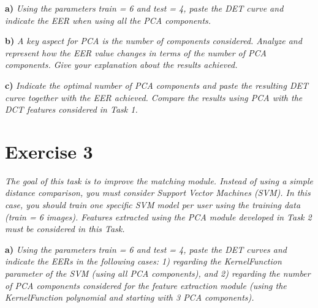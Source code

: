 \documentclass[11pt]{article}
\begin{document}

\textbf{a)} \emph{Using the parameters train = 6 and test = 4, paste the DET curve and indicate the EER when using all the PCA components.}

\textbf{b)} \emph{A key aspect for PCA is the number of components considered. Analyze and represent how the EER value changes in terms of the number of PCA components. Give your explanation about the results achieved.}

\textbf{c)} \textit{Indicate the optimal number of PCA components and paste the resulting DET curve together with the EER achieved. Compare the results using PCA with the DCT features considered in Task 1.}

\section*{Exercise 3}

\textit{The goal of this task is to improve the matching module. Instead of using a simple distance comparison, you must consider Support Vector Machines (SVM). In this case, you should train one specific SVM model per user using the training data (train = 6 images). Features extracted using the PCA module developed in Task 2 must be considered in this Task.}


\textbf{a)} \emph{Using the parameters train = 6 and test = 4, paste the DET curves and indicate the EERs in the following cases: 1) regarding the KernelFunction parameter of the SVM (using all PCA components), and 2) regarding the number of PCA components considered for the feature extraction module (using the KernelFunction polynomial and starting with 3 PCA components).}
\end{document}
